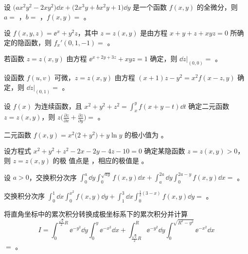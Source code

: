 \begin{ti}
	设 $\bigl( ax^2 y^2 - 2xy^2 \bigr) \dd{x} + \bigl( 2x^3 y + bx^2 y + 1 \bigr) \dd{y}$ 是一个函数 $f(x,y)$ 的全微分，则 $a = $ \hua，$b = $ \hua，$f(x,y) = $ \hua。
\end{ti}

\begin{ti}
	设 $f(x,y,z) = \ee^x + y^2 z$，其中 $z = z(x,y)$ 是由方程 $x + y + z + xyz = 0$ 所确定的隐函数，则 $f_x'(0,1,-1) = $ \hua。
\end{ti}

\begin{ti}
	若函数 $z = z(x,y)$ 由方程 $\ee^{x+2y+3z} + xyz = 1$ 确定，则 $\dd{z}|_{(0,0)} = $ \hua。
\end{ti}

\begin{ti}
	设函数 $f(u,v)$ 可微，$z = z(x,y)$ 由方程 $(x+1)z - y^2 = x^2 f(x-z,y)$ 确定，则 $\dd{z}|_{(0,1)} = $ \hua。
\end{ti}

\begin{ti}
	设 $f(x)$ 为连续函数，且 $x^2 + y^2 + z^2 = \int_x^y f(x+y-t) \dd{t}$ 确定二元函数 $z = z(x,y)$，则 $z \biggl( \frac{\partial z}{\partial x} + \frac{\partial z}{\partial y} \biggr) = $ \hua。
\end{ti}

\begin{ti}
	二元函数 $f(x,y) = x^2 \bigl( 2 + y^2 \bigr) + y \ln y$ 的极小值为 \hua。
\end{ti}

\begin{ti}
	设方程式 $x^2 + y^2 + z^2 - 2x - 2y - 4z - 10 = 0$ 确定某隐函数 $z = z(x,y) > 0$，则 $z = z(x,y)$ 的极 \hua{} 值点是 \hua，相应的极值是 \hua。
\end{ti}

\begin{ti}
	设 $a > 0$，交换积分次序 $\int_0^a \dd{y} \int_0^{\sqrt{ay}} f(x,y) \dd{x} + \int_a^{2a} \dd{y} \int_0^{2a-y} f(x,y) \dd{x} = $ \hua。
\end{ti}

\begin{ti}
	交换积分次序 $\int_0^1 \dd{x} \int_0^{x^2} f(x,y) \dd{y} + \int_1^3 \dd{x} \int_0^{\frac{1}{2}(3-x)} f(x,y) \dd{y} = $ \hua。
\end{ti}

\begin{ti}
	将直角坐标中的累次积分转换成极坐标系下的累次积分并计算
	\[
		I = \int_0^{\frac{\sqrt{2}}{2}R} \ee^{-y^2} \dd{y} \int_0^y \ee^{-x^2} \dd{x} + \int_{\frac{\sqrt{2}}{2}R}^R \ee^{-y^2} \dd{y} \int_0^{\sqrt{R^2-y^2}} \ee^{-x^2} \dd{x}
	\]
	$=$ \hua。
\end{ti}

